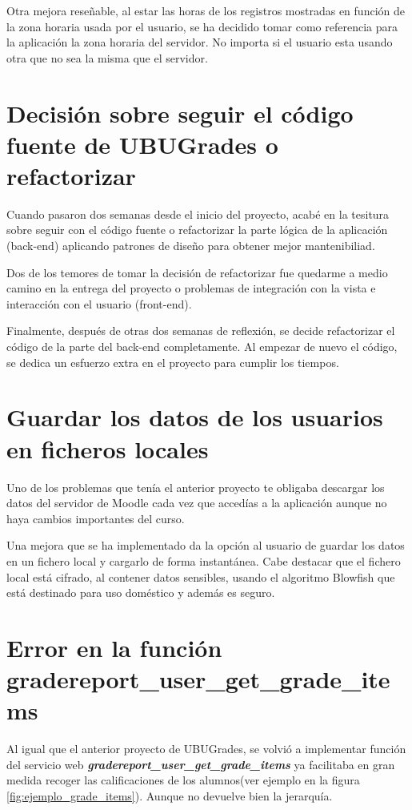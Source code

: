 Otra mejora reseñable, al estar las horas de los registros mostradas en función de la zona horaria usada por el usuario, se ha decidido tomar como referencia para la aplicación la zona horaria del servidor. No importa si el usuario esta usando otra que no sea la misma que el servidor.

\section{Decisión sobre seguir el código fuente de UBUGrades o refactorizar}

Cuando pasaron dos semanas desde el inicio del proyecto, acabé en la tesitura sobre seguir con el código fuente o refactorizar la parte lógica de la aplicación (back-end)\cite{noauthor_what_nodate} aplicando patrones de diseño para obtener mejor mantenibiliad. 

Dos de los temores de tomar la decisión de refactorizar fue quedarme a medio camino en la entrega del proyecto o problemas de integración con la vista e interacción con el usuario (front-end).

Finalmente, después de otras dos semanas de reflexión, se decide refactorizar el código de la parte del back-end  completamente. Al empezar de nuevo el código,  se dedica un esfuerzo extra en el proyecto para cumplir los tiempos.

\section{Guardar los datos de los usuarios en ficheros locales}

Uno de los problemas que tenía el anterior proyecto te obligaba descargar los datos del servidor de Moodle cada vez que accedías a la aplicación aunque no haya cambios importantes del curso.

Una mejora que se ha implementado da la opción al usuario de guardar los datos en un fichero local y cargarlo de forma instantánea. Cabe destacar que el fichero local está cifrado, al contener datos sensibles, usando el algoritmo Blowfish \cite{noauthor_schneier_nodate} que está destinado para uso doméstico y además es seguro.


\section{Error en la función gradereport\_user\_get\_grade\_items}

Al igual que el anterior proyecto de UBUGrades, se volvió a implementar función del servicio web \textbf{\textit{gradereport\_user\_get\_grade\_items}} ya facilitaba en gran medida recoger las calificaciones de los alumnos(ver ejemplo en la figura \ref{fig:ejemplo_grade_items}). Aunque no devuelve bien la jerarquía.

